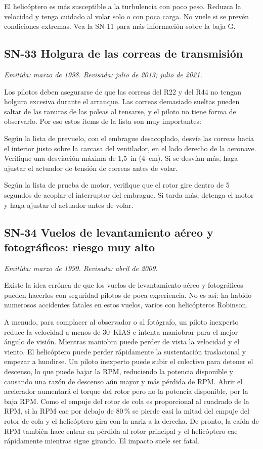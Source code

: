 El helicóptero es más susceptible a la turbulencia con poco peso. Reduzca la velocidad y tenga cuidado al volar solo o con poca carga. No vuele si se prevén condiciones extremas. Vea la SN-11 para más información sobre la baja G.

\subsection*{SN-33 \quad Holgura de las correas de transmisión}
{\small\textit{Emitida: marzo de 1998. Revisada: julio de 2013; julio de 2021.}}

Los pilotos deben asegurarse de que las correas del R22 y del R44 no tengan holgura excesiva durante el arranque. Las correas demasiado sueltas pueden saltar de las ranuras de las poleas al tensarse, y el piloto no tiene forma de observarlo. Por eso estos ítems de la lista son muy importantes:

\begin{pasos}
\item Según la lista de prevuelo, con el embrague desacoplado, desvíe las correas hacia el interior justo sobre la carcasa del ventilador, en el lado derecho de la aeronave. Verifique una desviación máxima de 1,5~in (4~cm). Si se desvían más, haga ajustar el actuador de tensión de correas antes de volar.
\item Según la lista de prueba de motor, verifique que el rotor gire dentro de 5 segundos de acoplar el interruptor del embrague. Si tarda más, detenga el motor y haga ajustar el actuador antes de volar.
\end{pasos}

\subsection*{SN-34 \quad Vuelos de levantamiento aéreo y fotográficos: riesgo muy alto}
{\small\textit{Emitida: marzo de 1999. Revisada: abril de 2009.}}

Existe la idea errónea de que los vuelos de levantamiento aéreo y fotográficos pueden hacerlos con seguridad pilotos de poca experiencia. No es así: ha habido numerosos accidentes fatales en estos vuelos, varios con helicópteros Robinson.

A menudo, para complacer al observador o al fotógrafo, un piloto inexperto reduce la velocidad a menos de 30~KIAS e intenta maniobrar para el mejor ángulo de visión. Mientras maniobra puede perder de vista la velocidad y el viento. El helicóptero puede perder rápidamente la sustentación traslacional y empezar a hundirse. Un piloto inexperto puede subir el colectivo para detener el descenso, lo que puede bajar la RPM, reduciendo la potencia disponible y causando una razón de descenso aún mayor y más pérdida de RPM. Abrir el acelerador aumentará el torque del rotor pero no la potencia disponible, por la baja RPM. Como el empuje del rotor de cola es proporcional al cuadrado de la RPM, si la RPM cae por debajo de 80\,\% se pierde casi la mitad del empuje del rotor de cola y el helicóptero gira con la nariz a la derecha. De pronto, la caída de RPM también hace entrar en pérdida al rotor principal y el helicóptero cae rápidamente mientras sigue girando. El impacto suele ser fatal.

